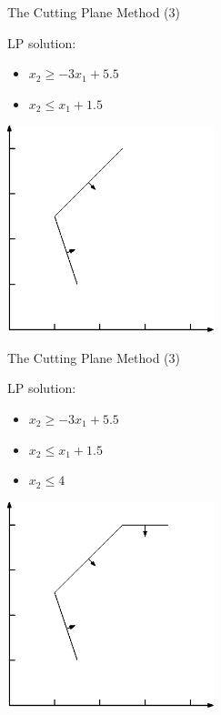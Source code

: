 \documentclass[10pt]{beamer}
\begin{document}
\begin{frame}[t]{The Cutting Plane Method (3)}
        \begin{minipage}[t]{0.48\textwidth}
            LP solution:        
            \begin{itemize}
                \item $ x_2 \geq -3x_1 + 5.5 $
                \item $ x_2 \leq x_1 + 1.5 $
            \end{itemize}
        \end{minipage}
        \begin{minipage}[t]{0.48\textwidth}
            \begin{center}
                \includegraphics[width=6cm]{cutting_plane002.eps} 
            \end{center}
        \end{minipage}        
\end{frame}

\begin{frame}[t]{The Cutting Plane Method (3)}
        \begin{minipage}[t]{0.48\textwidth}
            LP solution:
            \begin{itemize}            
                \item $ x_2 \geq -3x_1 + 5.5 $ 
                \item $ x_2 \leq x_1 + 1.5 $
                \item $ x_2 \leq 4$
            \end{itemize}
        \end{minipage}
        \begin{minipage}[t]{0.48\textwidth}
            \begin{center}
                \includegraphics[width=6cm]{cutting_plane003.eps} 
            \end{center}
        \end{minipage}        
\end{frame}
\end{document}
